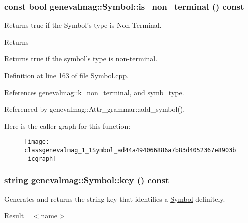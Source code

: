\hypertarget{classgenevalmag_1_1Symbol_ad44a494066886a7b83d4052367e8903b}{
\subsubsection[{is\_\-non\_\-terminal}]{\setlength{\rightskip}{0pt plus 5cm}const bool genevalmag::Symbol::is\_\-non\_\-terminal () const}}
\label{classgenevalmag_1_1Symbol_ad44a494066886a7b83d4052367e8903b}
Returns true if the Symbol's type is Non Terminal. \begin{DoxyReturn}{Returns}

\end{DoxyReturn}
Returns true if the symbol's type is non-\/terminal. 

Definition at line 163 of file Symbol.cpp.



References genevalmag::k\_\-non\_\-terminal, and symb\_\-type.



Referenced by genevalmag::Attr\_\-grammar::add\_\-symbol().



Here is the caller graph for this function:\nopagebreak
\begin{figure}[H]
\begin{center}
\leavevmode
\texttt{[image: classgenevalmag\_1\_1Symbol\_ad44a494066886a7b83d4052367e8903b\_icgraph]}
\end{center}
\end{figure}


\hypertarget{classgenevalmag_1_1Symbol_aab0679bd9e80cc86a1c6fccca3a4753c}{
\subsubsection[{key}]{\setlength{\rightskip}{0pt plus 5cm}string genevalmag::Symbol::key () const}}
\label{classgenevalmag_1_1Symbol_aab0679bd9e80cc86a1c6fccca3a4753c}
Generates and returns the string key that identifies a \hyperlink{classgenevalmag_1_1Symbol}{Symbol} definitely.\par
 \par
 Result= $<$name$>$\par


